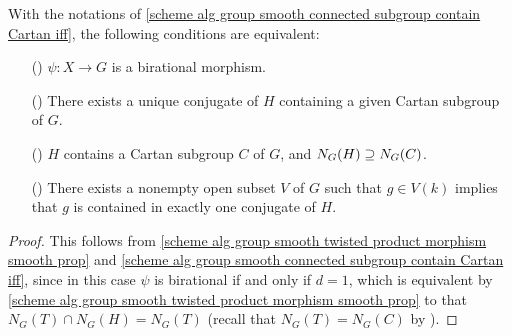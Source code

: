 \begin{corollary}\label{scheme alg group smooth twisted product morphism birational iff}
With the notations of \cref{scheme alg group smooth connected subgroup contain Cartan iff}, the following conditions are equivalent:
\begin{enumerate}
    \item[(\rmnum{1})] $\psi:X\to G$ is a birational morphism.
    \item[(\rmnum{2})] There exists a unique conjugate of $H$ containing a given Cartan subgroup of $G$.
    \item[(\rmnum{3})] $H$ contains a Cartan subgroup $C$ of $G$, and $N_G(H)\supseteq N_G(C)$.
    \item[(\rmnum{4})] There exists a nonempty open subset $V$ of $G$ such that $g\in V(k)$ implies that $g$ is contained in exactly one conjugate of $H$.   
\end{enumerate}
\end{corollary}
\begin{proof}
This follows from \cref{scheme alg group smooth twisted product morphism smooth prop} and \cref{scheme alg group smooth connected subgroup contain Cartan iff}, since in this case $\psi$ is birational if and only if $d=1$, which is equivalent by \cref{scheme alg group smooth twisted product morphism smooth prop} to that $N_G(T)\cap N_G(H)=N_G(T)$ (recall that $N_G(T)=N_G(C)$ by \cite{scheme smooth affine ft normalizer of torus and Cartan equal}).
\end{proof}

